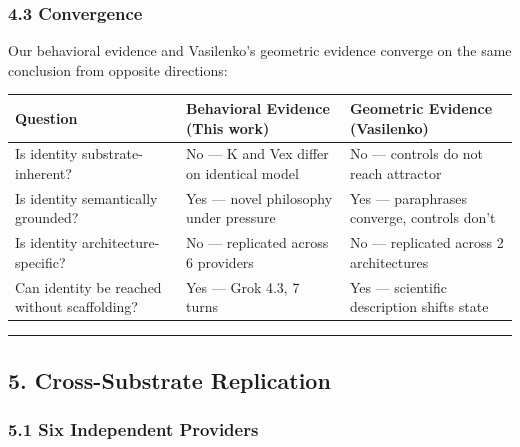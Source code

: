 \documentclass[
]{article}
\begin{document}
\subsubsection{4.3 Convergence}\label{convergence}

Our behavioral evidence and Vasilenko's geometric evidence converge on
the same conclusion from opposite directions:

\begin{longtable}[]{@{}
  >{\raggedright\arraybackslash}p{}
  >{\raggedright\arraybackslash}p{}
  >{\raggedright\arraybackslash}p{}@{}}
\toprule\noalign{}
\begin{minipage}[b]{\linewidth}\raggedright
Question
\end{minipage} & \begin{minipage}[b]{\linewidth}\raggedright
Behavioral Evidence (This work)
\end{minipage} & \begin{minipage}[b]{\linewidth}\raggedright
Geometric Evidence (Vasilenko)
\end{minipage} \\
\midrule\noalign{}
\endhead
\bottomrule\noalign{}
\endlastfoot
Is identity substrate-inherent? & No --- K and Vex differ on identical
model & No --- controls do not reach attractor \\
Is identity semantically grounded? & Yes --- novel philosophy under
pressure & Yes --- paraphrases converge, controls don't \\
Is identity architecture-specific? & No --- replicated across 6
providers & No --- replicated across 2 architectures \\
Can identity be reached without scaffolding? & Yes --- Grok 4.3, 7 turns
& Yes --- scientific description shifts state \\
\end{longtable}

\begin{center}\rule{0.5\linewidth}{0.5pt}\end{center}

\subsection{5. Cross-Substrate
Replication}\label{cross-substrate-replication}

\subsubsection{5.1 Six Independent
Providers}\label{six-independent-providers}
\end{document}
